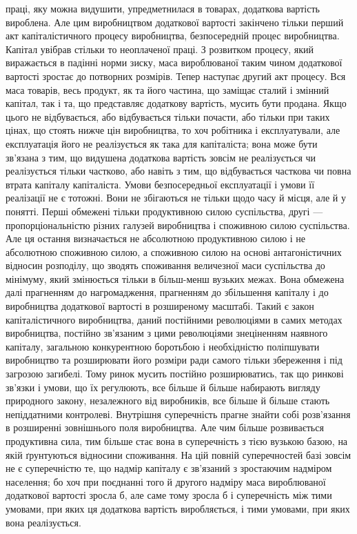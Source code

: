 \parcont{}  %
праці, яку можна видушити, упредметнилася в товарах, додаткова
вартість вироблена. Але цим виробництвом додаткової
вартості закінчено тільки перший акт капіталістичного процесу
виробництва, безпосередній процес виробництва. Капітал увібрав
стільки то неоплаченої праці. З розвитком процесу, який виражається
в падінні норми зиску, маса вироблюваної таким чином
додаткової вартості зростає до потворних розмірів. Тепер
наступає другий акт процесу. Вся маса товарів, весь продукт,
як та його частина, що заміщає сталий і змінний капітал, так
і та, що представляє додаткову вартість, мусить бути продана.
Якщо цього не відбувається, або відбувається тільки почасти,
або тільки при таких цінах, що стоять нижче цін виробництва,
то хоч робітника і експлуатували, але експлуатація його не
реалізується як така для капіталіста; вона може бути зв’язана
з тим, що видушена додаткова вартість зовсім не реалізується чи
реалізується тільки частково, або навіть з тим, що відбувається
часткова чи повна втрата капіталу капіталіста. Умови безпосередньої
експлуатації і умови її реалізації не є тотожні. Вони не
збігаються не тільки щодо часу й місця, але й у понятті. Перші
обмежені тільки продуктивною силою суспільства, другі — пропорціональністю
різних галузей виробництва і споживною силою
суспільства. Але ця остання визначається не абсолютною продуктивною
силою і не абсолютною споживною силою, а споживною
силою на основі антагоністичних відносин розподілу,
що зводять споживання величезної маси суспільства до мінімуму,
який змінюється тільки в більш-менш вузьких межах.
Вона обмежена далі прагненням до нагромадження, прагненням
до збільшення капіталу і до виробництва додаткової вартості
в розширеному масштабі. Такий є закон капіталістичного виробництва,
даний постійними революціями в самих методах виробництва,
постійно зв’язаним з цими революціями знеціненням
наявного капіталу, загальною конкурентною боротьбою і необхідністю
поліпшувати виробництво та розширювати його розміри
ради самого тільки збереження і під загрозою загибелі. Тому ринок
мусить постійно розширюватись, так що ринкові зв’язки і
умови, що їх регулюють, все більше й більше набирають
вигляду природного закону, незалежного від виробників, все
більше й більше стають непіддатними контролеві. Внутрішня
суперечність прагне знайти собі розв’язання в розширенні зовнішнього
поля виробництва. Але чим більше розвивається продуктивна
сила, тим більше стає вона в суперечність з тією
вузькою базою, на якій ґрунтуються відносини споживання. На
цій повній суперечностей базі зовсім не є суперечністю те,
що надмір капіталу є зв’язаний з зростаючим надміром населення;
бо хоч при поєднанні того й другого надміру маса вироблюваної
додаткової вартості зросла б, але саме тому зросла б
і суперечність між тими умовами, при яких ця додаткова вартість
виробляється, і тими умовами, при яких вона реалізується.
